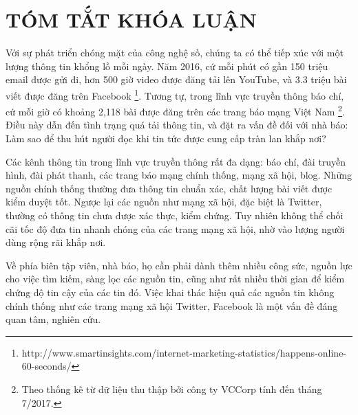 \pagestyle{fancy}
    \lhead{}    \chead{}         	\rhead{}
    \lfoot{}    \cfoot{\thepage}	\rfoot{}
    \renewcommand{\headrulewidth}{0.4pt}
    \renewcommand{\footrulewidth}{0.4pt}

\chapter*{\centering TÓM TẮT KHÓA LUẬN}
 
\ifpdf
    \graphicspath{{Abstract/AbstractFigs/PNG/}{Abstract/AbstractFigs/PDF/}{Abstract/AbstractFigs/}}
\else
    \graphicspath{{Abstract/AbstractFigs/EPS/}{Abstract/AbstractFigs/}}
\fi

Với sự phát triển chóng mặt của công nghệ số, chúng ta có thể tiếp xúc với một lượng thông tin khổng lồ mỗi ngày. Năm 2016, cứ mỗi phút có gần 150 triệu email được gửi đi, hơn 500 giờ video được đăng tải lên YouTube, và	3.3 triệu bài viết được đăng trên Facebook \footnote{http://www.smartinsights.com/internet-marketing-statistics/happens-online-60-seconds/}. Tương tự, trong lĩnh vực truyền thông báo chí, cứ mỗi giờ có khoảng 2,118 bài được đăng trên các trang báo mạng Việt Nam \footnote{Theo thống kê từ dữ liệu thu thập bởi công ty VCCorp tính đến tháng 7/2017.}. Điều này dẫn đến tình trạng quá tải thông tin, và đặt ra vấn đề đối với nhà báo: Làm sao để thu hút người đọc khi tin tức được cung cấp tràn lan khắp nơi?

Các kênh thông tin trong lĩnh vực truyền thông rất đa dạng: báo chí, đài truyền hình, đài phát thanh, các trang báo mạng chính thống, mạng xã hội, blog. Những nguồn chính thống thường đưa thông tin chuẩn xác, chất lượng bài viết được kiểm duyệt tốt. Ngược lại các nguồn như mạng xã hội, đặc biệt là Twitter, thường có thông tin chưa được xác thực, kiểm chứng. Tuy nhiên không thể chối cãi tốc độ đưa tin nhanh chóng của các trang mạng xã hội, nhờ vào lượng người dùng rộng rãi khắp nơi.

Về phía biên tập viên, nhà báo, họ cần phải dành thêm nhiều công sức, nguồn lực cho việc tìm kiếm, sàng lọc các nguồn tin, cũng như rất nhiều thời gian để kiểm chứng độ tin cậy của các tin đó. Việc khai thác hiệu quả các nguồn tin không chính thống như các trang mạng xã hội Twitter, Facebook là một vấn đề đáng quan tâm, nghiên cứu.

